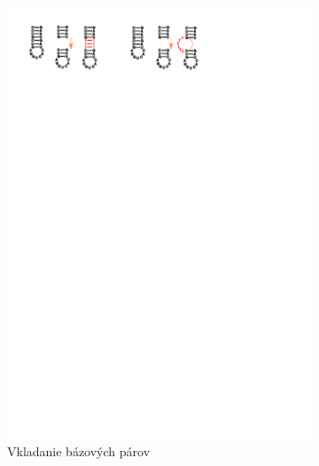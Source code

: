 \begin{figure}
  \centering
  \begin{subfigure}{\wi}
    \includegraphics[clip, trim=1cm 25cm 14cm 1cm, width=1\textwidth]{../img/alg/insert/stem}
    \caption{Vkladanie bázových párov}
  \end{subfigure}
  \begin{subfigure}{\wi}

\end{subfigure}
\end{figure}
